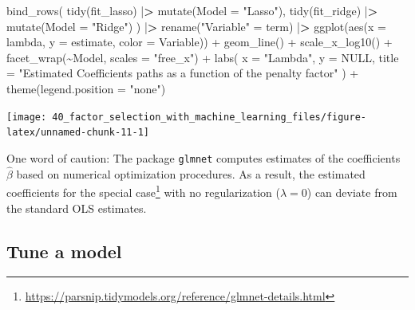 \documentclass[
]{krantz}
\newenvironment{Shaded}{\begin{snugshade}}{\end{snugshade}}
\newcommand{\AttributeTok}[1]{\textcolor[rgb]{0.61,0.61,0.61}{#1}}
\newcommand{\ConstantTok}[1]{\textcolor[rgb]{0,0,0}{#1}}
\newcommand{\ErrorTok}[1]{\textcolor[rgb]{0.14,0.14,0.14}{\textbf{#1}}}
\newcommand{\FunctionTok}[1]{\textcolor[rgb]{0,0,0}{#1}}
\newcommand{\NormalTok}[1]{#1}
\newcommand{\OtherTok}[1]{\textcolor[rgb]{0.37,0.37,0.37}{#1}}
\newcommand{\SpecialCharTok}[1]{\textcolor[rgb]{0,0,0}{#1}}
\newcommand{\StringTok}[1]{\textcolor[rgb]{0.5,0.5,0.5}{#1}}
\renewcommand{\href}[2]{#2\footnote{\url{#1}}}
\begin{document}
\begin{Shaded}
\begin{Highlighting}[]
\FunctionTok{bind\_rows}\NormalTok{(}
  \FunctionTok{tidy}\NormalTok{(fit\_lasso) }\SpecialCharTok{|}\ErrorTok{\textgreater{}} \FunctionTok{mutate}\NormalTok{(}\AttributeTok{Model =} \StringTok{"Lasso"}\NormalTok{),}
  \FunctionTok{tidy}\NormalTok{(fit\_ridge) }\SpecialCharTok{|}\ErrorTok{\textgreater{}} \FunctionTok{mutate}\NormalTok{(}\AttributeTok{Model =} \StringTok{"Ridge"}\NormalTok{)}
\NormalTok{) }\SpecialCharTok{|}\ErrorTok{\textgreater{}}
  \FunctionTok{rename}\NormalTok{(}\StringTok{"Variable"} \OtherTok{=}\NormalTok{ term) }\SpecialCharTok{|}\ErrorTok{\textgreater{}}
  \FunctionTok{ggplot}\NormalTok{(}\FunctionTok{aes}\NormalTok{(}\AttributeTok{x =}\NormalTok{ lambda, }\AttributeTok{y =}\NormalTok{ estimate, }\AttributeTok{color =}\NormalTok{ Variable)) }\SpecialCharTok{+}
  \FunctionTok{geom\_line}\NormalTok{() }\SpecialCharTok{+}
  \FunctionTok{scale\_x\_log10}\NormalTok{() }\SpecialCharTok{+}
  \FunctionTok{facet\_wrap}\NormalTok{(}\SpecialCharTok{\textasciitilde{}}\NormalTok{Model, }\AttributeTok{scales =} \StringTok{"free\_x"}\NormalTok{) }\SpecialCharTok{+}
  \FunctionTok{labs}\NormalTok{(}
    \AttributeTok{x =} \StringTok{"Lambda"}\NormalTok{, }\AttributeTok{y =} \ConstantTok{NULL}\NormalTok{,}
    \AttributeTok{title =} \StringTok{"Estimated Coefficients paths as a}
\StringTok{    function of the penalty factor"}
\NormalTok{  ) }\SpecialCharTok{+}
  \FunctionTok{theme}\NormalTok{(}\AttributeTok{legend.position =} \StringTok{"none"}\NormalTok{)}
\end{Highlighting}
\end{Shaded}

\begin{center}\texttt{[image: 40\_factor\_selection\_with\_machine\_learning\_files/figure-latex/unnamed-chunk-11-1]} \end{center}

One word of caution: The package \texttt{glmnet} computes estimates of the coefficients \(\hat\beta\) based on numerical optimization procedures.
As a result, the estimated coefficients for the \href{https://parsnip.tidymodels.org/reference/glmnet-details.html}{special case} with no regularization (\(\lambda = 0\)) can deviate from the standard OLS estimates.

\hypertarget{tune-a-model}{%
\subsection{Tune a model}\label{tune-a-model}}
\end{document}
